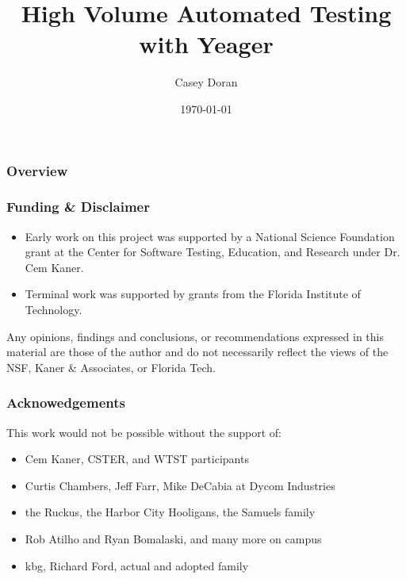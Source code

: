 \documentclass{beamer}
\title[Yeager]{High Volume Automated Testing with Yeager}
\author{Casey Doran}
\institute[Florida Tech]
{
Florida Institute of Technology \\
\medskip
\textit{cdoran2011@my.fit.edu}
}
\date{\today}
\begin{document}
\begin{frame}
\titlepage
\end{frame}

\begin{frame}
\frametitle{Overview}
\tableofcontents
\end{frame}

\begin{frame}
  \frametitle{Funding \& Disclaimer}
  \begin{itemize}
  \item Early work on this project was supported by a National Science Foundation grant at the Center for Software Testing, Education, and Research under Dr. Cem Kaner.
  \item Terminal work was supported by grants from the Florida Institute of Technology.
\end{itemize}
Any opinions, findings and conclusions, or recommendations expressed in this material are those of the author and do not necessarily reflect the views of the NSF, Kaner \& Associates, or Florida Tech.
\end{frame}

\begin{frame}
  \frametitle{Acknowedgements}
  This work would not be possible without the support of:
  \begin{itemize}
    \item Cem Kaner, CSTER, and WTST participants
    \item Curtis Chambers, Jeff Farr, Mike DeCabia at Dycom Industries
    \item the Ruckus, the Harbor City Hooligans, the Samuels family
    \item Rob Atilho and Ryan Bomalaski, and many more on campus
    \item kbg, Richard Ford, actual and adopted family
  \end{itemize}
\end{frame}
\end{document}
